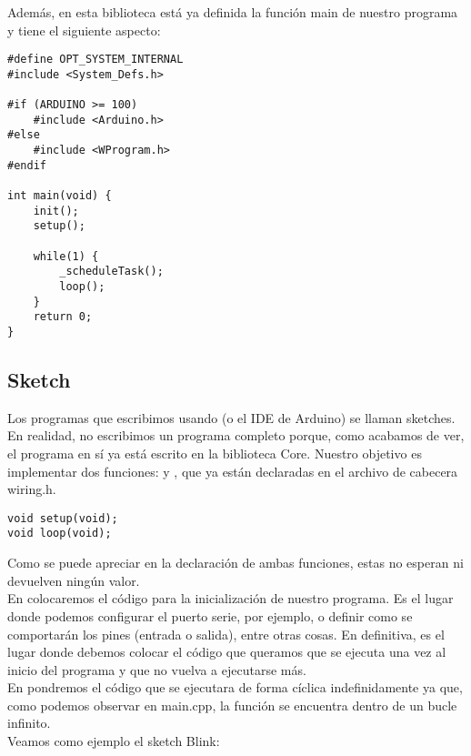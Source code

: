 Además, en esta biblioteca está ya definida la función main de nuestro programa y tiene el siguiente aspecto:
\lstset{language=C++}
\begin{lstlisting}[caption=main.cpp]
#define OPT_SYSTEM_INTERNAL
#include <System_Defs.h>

#if (ARDUINO >= 100)
	#include <Arduino.h>
#else
	#include <WProgram.h>
#endif

int main(void) {
	init();
	setup();
	
	while(1) {
		_scheduleTask();
		loop();
	}
	return 0;
}
\end{lstlisting}

\subsection{Sketch}
Los programas que escribimos usando  (o el IDE de Arduino) se llaman sketches. En realidad, no escribimos un programa completo porque, como acabamos de ver, el programa en sí ya está escrito en la biblioteca Core. Nuestro objetivo es implementar dos funciones:  y , que ya están declaradas en el archivo de cabecera wiring.h.\\
\begin{lstlisting}[caption=Sección de wiring.h]
void setup(void);
void loop(void);
\end{lstlisting}

Como se puede apreciar en la declaración de ambas funciones, estas no esperan ni devuelven ningún valor.\\

En  colocaremos el código para la inicialización de nuestro programa. Es el lugar donde podemos configurar el puerto serie, por ejemplo, o definir como se comportarán los pines (entrada o salida), entre otras cosas. En definitiva, es el lugar donde debemos colocar el código que queramos que se ejecuta una vez al inicio del programa y que no vuelva a ejecutarse más.\\
En  pondremos el código que se ejecutara de forma cíclica indefinidamente ya que, como podemos observar en main.cpp, la función  se encuentra dentro de un bucle infinito.\\

Veamos como ejemplo el sketch Blink:


